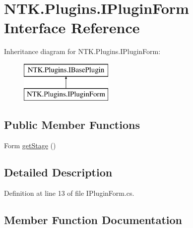 \hypertarget{interface_n_t_k_1_1_plugins_1_1_i_plugin_form}{}\section{N\+T\+K.\+Plugins.\+I\+Plugin\+Form Interface Reference}
\label{interface_n_t_k_1_1_plugins_1_1_i_plugin_form}


 


Inheritance diagram for N\+T\+K.\+Plugins.\+I\+Plugin\+Form\+:\begin{figure}[H]
\begin{center}
\leavevmode
\includegraphics[height=2.000000cm]{d5/ddf/interface_n_t_k_1_1_plugins_1_1_i_plugin_form}
\end{center}
\end{figure}
\subsection*{Public Member Functions}
\begin{DoxyCompactItemize}
\item 
Form \mbox{\hyperlink{interface_n_t_k_1_1_plugins_1_1_i_plugin_form_ad4f472efa011276c6e8c40fa4da461df}{get\+Stage}} ()
\end{DoxyCompactItemize}


\subsection{Detailed Description}




Definition at line 13 of file I\+Plugin\+Form.\+cs.



\subsection{Member Function Documentation}
\mbox{\label{interface_n_t_k_1_1_plugins_1_1_i_plugin_form_ad4f472efa011276c6e8c40fa4da461df}} 
